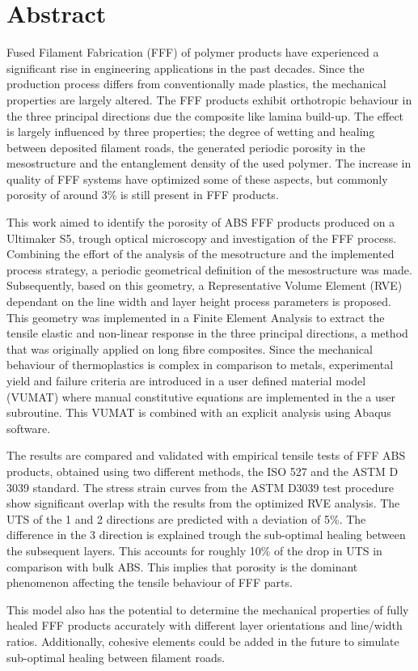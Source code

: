 \chapter*{Abstract}


Fused Filament Fabrication (FFF) of polymer products have experienced a significant rise in engineering applications in the past decades. Since the production process differs from conventionally made plastics, the mechanical properties are largely altered. The FFF products exhibit orthotropic behaviour in the three principal directions due the composite like lamina build-up. The effect is largely influenced by three properties; the degree of wetting and healing between deposited filament roads, the generated periodic porosity in the mesostructure and the entanglement density of the used polymer. The increase in quality of FFF systems have optimized some of these aspects, but commonly porosity of around 3\% is still present in FFF products.

This work aimed to identify the porosity of ABS FFF products produced on a Ultimaker S5, trough optical microscopy and investigation of the FFF process. Combining the effort of the analysis of the mesotructure and the implemented process strategy, a periodic geometrical definition of the mesostructure was made. 
Subsequently, based on this geometry, a Representative Volume Element (RVE) dependant on the line width and layer height process parameters is proposed. This geometry was implemented in a Finite Element Analysis to extract the tensile elastic and non-linear response in the three principal directions, a method that was originally applied on long fibre composites. Since the mechanical behaviour of thermoplastics is complex in comparison to metals, experimental yield and failure criteria are introduced in a user defined material model (VUMAT) where manual constitutive equations are implemented in the a user subroutine. This VUMAT is combined with an explicit analysis using Abaqus software. 

The results are compared and validated with empirical tensile tests of FFF ABS products, obtained using two different methods, the ISO 527 and the ASTM D 3039 standard. The stress strain curves from the ASTM D3039 test procedure show significant overlap with the results from the optimized RVE analysis. The UTS of the 1 and 2 directions are predicted with a deviation of 5\%. The difference in the 3 direction is explained trough the sub-optimal healing between the subsequent layers. This accounts for roughly 10\% of the drop in UTS in comparison with bulk ABS.  This implies that porosity is the dominant phenomenon affecting the tensile behaviour of FFF parts. 

This model also has the potential to determine the mechanical properties of fully healed FFF products accurately with different layer orientations and line/width ratios. Additionally, cohesive elements could be added in the future to simulate sub-optimal healing between filament roads.



